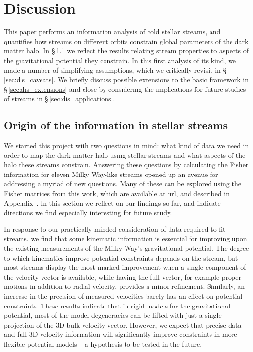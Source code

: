 \documentclass[modern]{aastex61}
\begin{document}
\section{Discussion}
\label{sec:discussion}
This paper performs an information analysis of cold stellar streams, and quantifies how streams on different orbits constrain global parameters of the dark matter halo.
In \S\,\ref{sec:dis_origin} we reflect the results relating stream properties to aspects of the gravitational potential they constrain.
In this first analysis of its kind, we made a number of simplifying assumptions, which we critically revisit in \S\,\ref{sec:dis_caveats}.
We briefly discuss possible extensions to the basic framework in \S\,\ref{sec:dis_extensions} and close by considering the implications for future studies of streams in \S\,\ref{sec:dis_applications}.

\subsection{Origin of the information in stellar streams}
\label{sec:dis_origin}
We started this project with two questions in mind: what kind of data we need in order to map the dark matter halo using stellar streams and what aspects of the halo these streams constrain.
Answering these questions by calculating the Fisher information for eleven Milky Way-like streams opened up an avenue for addressing a myriad of new questions.
Many of these can be explored using the Fisher matrices from this work, which are available at url, and described in Appendix~.
In this section we reflect on our findings so far, and indicate directions we find especially interesting for future study.

In response to our practically minded consideration of data required to fit streams, we find that some kinematic information is essential for improving upon the existing measurements of the Milky Way's gravitational potential.
The degree to which kinematics improve potential constraints depends on the stream, but most streams display the most marked improvement when a single component of the velocity vector is available, while having the full vector, for example proper motions in addition to radial velocity, provides a minor refinement.
Similarly, an increase in the precision of measured velocities barely has an effect on potential constraints.
These results indicate that in rigid models for the gravitational potential, most of the model degeneracies can be lifted with just a single projection of the 3D bulk-velocity vector.
However, we expect that precise data and full 3D velocity information will significantly improve constraints in more flexible potential models  -- a hypothesis to be tested in the future.
\end{document}

